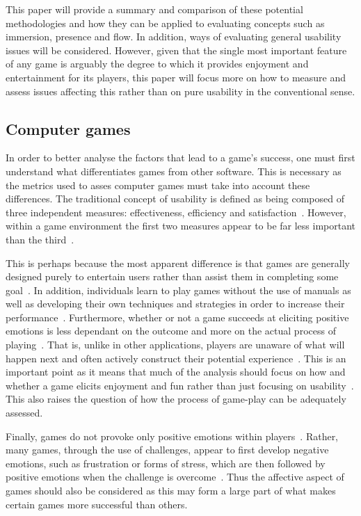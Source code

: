 This paper will provide a summary and comparison of these potential methodologies and how they can be applied to evaluating concepts such as immersion, presence and flow. In addition, ways of evaluating general usability issues will be considered. However, given that the single most important feature of any game is arguably the degree to which it provides enjoyment and entertainment for its players, this paper will focus more on how to measure and assess issues affecting this rather than on pure usability in the conventional sense.

\subsection{Computer games}
In order to better analyse the factors that lead to a game's success, one must first understand what differentiates games from other software. This is necessary as the metrics used to asses computer games must take into account these differences. The traditional concept of usability is defined as being composed of three independent measures: effectiveness, efficiency and satisfaction~\citep{Korh06}. However, within a game environment the first two measures appear to be far less important than the third~\citep{Fede02}.

This is perhaps because the most apparent difference is that games are generally designed purely to entertain users rather than assist them in completing some goal~\citep{Pine08}. In addition, individuals learn to play games without the use of manuals as well as developing their own techniques and strategies in order to increase their performance~\citep{Fede02}. Furthermore, whether or not a game succeeds at eliciting positive emotions is less dependant on the outcome and more on the actual process of playing~\citep{Mand06}. That is, unlike in other applications, players are unaware of what will happen next and often actively construct their potential experience~\citep{Korh06}. This is an important point as it means that much of the analysis should focus on how and whether a game elicits enjoyment and fun rather than just focusing on usability~\citep{Hazl06}. This also raises the question of how the process of game-play can be adequately assessed.

Finally, games do not provoke only positive emotions within players~\citep{Hazl06}. Rather, many games, through the use of challenges, appear to first develop negative emotions, such as frustration or forms of stress, which are then followed by positive emotions when the challenge is overcome~\citep{Ermi05}. Thus the affective aspect of games should also be considered as this may form a large part of what makes certain games more successful than others.

